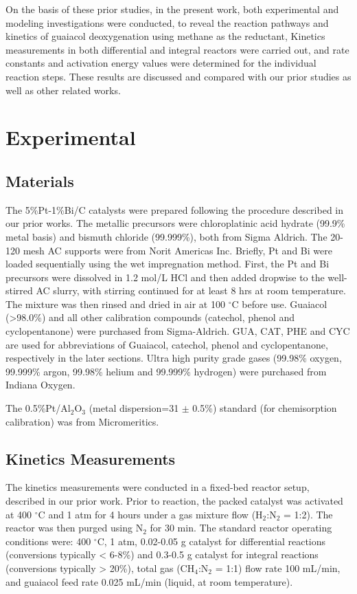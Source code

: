 \documentclass[journal=iecred,manuscript=article]{achemso}
\begin{document}
On the basis of these prior studies\cite{Xiao2015, Gao2014, Gao2015},
in the present work,
both experimental and modeling investigations were conducted,
to reveal the reaction pathways and kinetics of guaiacol deoxygenation using methane as the reductant,
Kinetics measurements in both differential and integral reactors were carried out, 
and rate constants and activation energy values were determined for the individual reaction steps.
These results are discussed and compared with our prior studies as well as other related works.

\section{Experimental}
\subsection{Materials}
The 5\%Pt-1\%Bi/C catalysts were prepared following the procedure described in our prior works.\cite{Hu2010, Hu2011, Xiao2015}
The metallic precursors were chloroplatinic acid hydrate (99.9\% metal basis) and bismuth chloride (99.999\%), both from Sigma Aldrich.
The 20-120 mesh AC supports were from Norit Americas Inc.
Briefly, Pt and Bi were loaded sequentially using the wet impregnation method. 
First, the Pt and Bi precursors were dissolved in 1.2 mol/L HCl and then added dropwise to the well-stirred AC slurry, 
with stirring continued for at least 8 hrs at room temperature. The mixture was then rinsed and dried in air at 100 $^{\circ}$C before use.
Guaiacol (>98.0\%) and all other calibration compounds (catechol,  phenol and cyclopentanone) were purchased from Sigma-Aldrich. 
GUA, CAT, PHE and CYC are used for abbreviations of Guaiacol, catechol, phenol and cyclopentanone, respectively in the later sections.
Ultra high purity grade gases (99.98\% oxygen, 99.999\% argon, 99.98\% helium and 99.999\% hydrogen) were purchased from Indiana Oxygen.

The 0.5\%Pt/Al$_{2}$O$_{3}$ (metal dispersion=31 $\pm$ 0.5\%) standard (for chemisorption calibration) was from Micromeritics.

\subsection{Kinetics Measurements}
The kinetics measurements were conducted in a fixed-bed reactor setup, described in our prior work. \cite{Gao2014, Gao2015}
Prior to reaction, the packed catalyst was activated at 400 $^{\circ}$C and 1 atm for 4 hours under a gas mixture flow (H$_{2}$:N$_{2}$ = 1:2). 
The reactor was then purged using N$_{2}$ for 30 min.
The standard reactor operating conditions were: 
400 $^{\circ}$C, 1 atm, 0.02-0.05 g catalyst for differential reactions (conversions typically < 6-8\%)
and 0.3-0.5 g catalyst for integral reactions (conversions typically > 20\%), 
total gas (CH$_{4}$:N$_{2}$ = 1:1) flow rate 100 mL/min, 
and guaiacol feed rate 0.025 mL/min (liquid, at room temperature).
\end{document}
